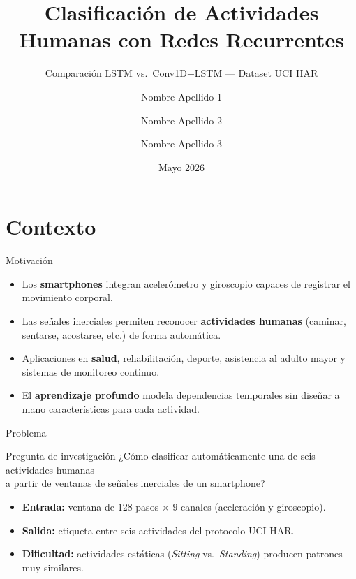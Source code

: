 \documentclass[aspectratio=169]{beamer}
\title[HAR UCI]{Clasificación de Actividades Humanas con Redes Recurrentes}
\subtitle{Comparación LSTM vs.\ Conv1D+LSTM — Dataset UCI HAR}
\author{%
  Nombre Apellido 1 \and
  Nombre Apellido 2 \and
  Nombre Apellido 3%
}
\institute{%
  Computación Inteligente\\
  Nombre de la institución%
}
\date{Mayo 2026}
\begin{document}
\begin{frame}
  \titlepage
\end{frame}

\section{Contexto}

\begin{frame}{Motivación}
  \begin{itemize}
    \item Los \textbf{smartphones} integran acelerómetro y giroscopio capaces de registrar el movimiento corporal.
    \item Las señales inerciales permiten reconocer \textbf{actividades humanas} (caminar, sentarse, acostarse, etc.) de forma automática.
    \item Aplicaciones en \textbf{salud}, rehabilitación, deporte, asistencia al adulto mayor y sistemas de monitoreo continuo.
    \item El \textbf{aprendizaje profundo} modela dependencias temporales sin diseñar a mano características para cada actividad.
  \end{itemize}
\end{frame}

\begin{frame}{Problema}
  \begin{block}{Pregunta de investigación}
    \centering
    ¿Cómo clasificar automáticamente una de seis actividades humanas\\
    a partir de ventanas de señales inerciales de un smartphone?
  \end{block}
  \vspace{0.25cm}
  \begin{itemize}
    \item \textbf{Entrada:} ventana de $128$ pasos $\times$ $9$ canales (aceleración y giroscopio).
    \item \textbf{Salida:} etiqueta entre seis actividades del protocolo UCI HAR.
    \item \textbf{Dificultad:} actividades estáticas (\textit{Sitting} vs.\ \textit{Standing}) producen patrones muy similares.
  \end{itemize}
\end{frame}
\end{document}
